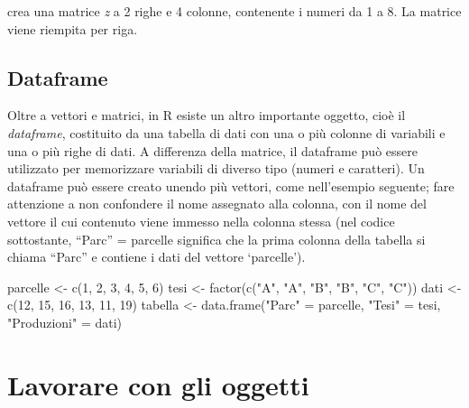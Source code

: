 \documentclass[
  12pt,
]{book}
\newenvironment{Shaded}{\begin{snugshade}}{\end{snugshade}}
\newcommand{\DecValTok}[1]{\textcolor[rgb]{0.00,0.00,0.81}{#1}}
\newcommand{\FunctionTok}[1]{\textcolor[rgb]{0.00,0.00,0.00}{#1}}
\newcommand{\NormalTok}[1]{#1}
\newcommand{\OtherTok}[1]{\textcolor[rgb]{0.56,0.35,0.01}{#1}}
\newcommand{\StringTok}[1]{\textcolor[rgb]{0.31,0.60,0.02}{#1}}
\begin{document}
crea una matrice \emph{z} a 2 righe e 4 colonne, contenente i numeri da 1 a 8. La matrice viene riempita per riga.

\hypertarget{dataframe}{%
\subsection{Dataframe}\label{dataframe}}

Oltre a vettori e matrici, in R esiste un altro importante oggetto, cioè il \emph{dataframe}, costituito da una tabella di dati con una o più colonne di variabili e una o più righe di dati. A differenza della matrice, il dataframe può essere utilizzato per memorizzare variabili di diverso tipo (numeri e caratteri). Un dataframe può essere creato unendo più vettori, come nell'esempio seguente; fare attenzione a non confondere il nome assegnato alla colonna, con il nome del vettore il cui contenuto viene immesso nella colonna stessa (nel codice sottostante, ``Parc'' = parcelle significa che la prima colonna della tabella si chiama ``Parc'' e contiene i dati del vettore `parcelle').

\begin{Shaded}
\begin{Highlighting}[]
\NormalTok{parcelle  }\OtherTok{\textless{}{-}}  \FunctionTok{c}\NormalTok{(}\DecValTok{1}\NormalTok{, }\DecValTok{2}\NormalTok{, }\DecValTok{3}\NormalTok{, }\DecValTok{4}\NormalTok{, }\DecValTok{5}\NormalTok{, }\DecValTok{6}\NormalTok{)}
\NormalTok{tesi  }\OtherTok{\textless{}{-}}  \FunctionTok{factor}\NormalTok{(}\FunctionTok{c}\NormalTok{(}\StringTok{"A"}\NormalTok{, }\StringTok{"A"}\NormalTok{, }\StringTok{"B"}\NormalTok{, }\StringTok{"B"}\NormalTok{, }\StringTok{"C"}\NormalTok{, }\StringTok{"C"}\NormalTok{))}
\NormalTok{dati  }\OtherTok{\textless{}{-}}  \FunctionTok{c}\NormalTok{(}\DecValTok{12}\NormalTok{, }\DecValTok{15}\NormalTok{, }\DecValTok{16}\NormalTok{, }\DecValTok{13}\NormalTok{, }\DecValTok{11}\NormalTok{, }\DecValTok{19}\NormalTok{)}
\NormalTok{tabella  }\OtherTok{\textless{}{-}}  \FunctionTok{data.frame}\NormalTok{(}\StringTok{"Parc"} \OtherTok{=}\NormalTok{ parcelle, }\StringTok{"Tesi"} \OtherTok{=}\NormalTok{ tesi,}
                        \StringTok{"Produzioni"} \OtherTok{=}\NormalTok{ dati)}
\end{Highlighting}
\end{Shaded}

\hypertarget{lavorare-con-gli-oggetti}{%
\section{Lavorare con gli oggetti}\label{lavorare-con-gli-oggetti}}
\end{document}
